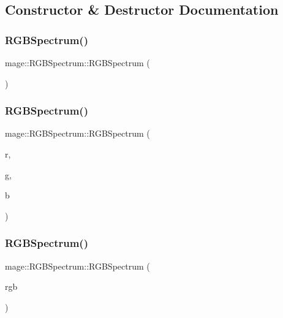 \subsection{Constructor \& Destructor Documentation}
\hypertarget{structmage_1_1_r_g_b_spectrum_ac9ebcf270e9572fd0af180f50b7ceb10}{}\label{structmage_1_1_r_g_b_spectrum_ac9ebcf270e9572fd0af180f50b7ceb10} 
\subsubsection{\texorpdfstring{R\+G\+B\+Spectrum()}{RGBSpectrum()}\hspace{0.1cm}{\footnotesize\ttfamily [1/8]}}
{\footnotesize\ttfamily mage\+::\+R\+G\+B\+Spectrum\+::\+R\+G\+B\+Spectrum (\begin{DoxyParamCaption}{ }\end{DoxyParamCaption})}

\hypertarget{structmage_1_1_r_g_b_spectrum_aae798159a0ea02e95347918ef881b3aa}{}\label{structmage_1_1_r_g_b_spectrum_aae798159a0ea02e95347918ef881b3aa} 
\subsubsection{\texorpdfstring{R\+G\+B\+Spectrum()}{RGBSpectrum()}\hspace{0.1cm}{\footnotesize\ttfamily [2/8]}}
{\footnotesize\ttfamily mage\+::\+R\+G\+B\+Spectrum\+::\+R\+G\+B\+Spectrum (\begin{DoxyParamCaption}\item[{float}]{r,  }\item[{float}]{g,  }\item[{float}]{b }\end{DoxyParamCaption})}

\hypertarget{structmage_1_1_r_g_b_spectrum_a5cf405a5fbaa641a421df5767d2847b4}{}\label{structmage_1_1_r_g_b_spectrum_a5cf405a5fbaa641a421df5767d2847b4} 
\subsubsection{\texorpdfstring{R\+G\+B\+Spectrum()}{RGBSpectrum()}\hspace{0.1cm}{\footnotesize\ttfamily [3/8]}}
{\footnotesize\ttfamily mage\+::\+R\+G\+B\+Spectrum\+::\+R\+G\+B\+Spectrum (\begin{DoxyParamCaption}\item[{const \hyperlink{structmage_1_1_r_g_b_spectrum}{R\+G\+B\+Spectrum} \&}]{rgb }\end{DoxyParamCaption})}

